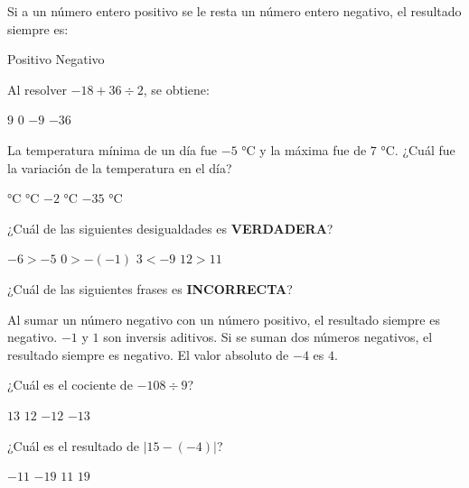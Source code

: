 \documentclass[spanish,letterpaper, 12pt, addpoints, answers]{exam}
\begin{document}
\begin{questions}
    \question[1] Si a un número entero positivo se le resta un número entero negativo, el resultado siempre es:
    \begin{choices}
        \CorrectChoice Positivo
        \choice Negativo
    \end{choices}
    \vspace{0.15in}

    \question[1] Al resolver $-18+36\div 2$, se obtiene:

    \begin{choices}
        \choice $9$
        \CorrectChoice $0$
        \choice $-9$
        \choice $-36$
    \end{choices}

    \question[1] La temperatura mínima de un día fue $-5$ °C y la máxima fue de $7$ °C. ¿Cuál fue la variación de la temperatura en el día?
    \begin{choices}
         °C
         °C
        \choice $-2$ °C
        \choice $-35$ °C
    \end{choices}

    \question[1] ¿Cuál de las siguientes desigualdades es \textbf{VERDADERA}?
    \begin{choices}
        \choice $-6>-5$
        \choice $0>-(-1)$
        \choice $3<-9$
        \CorrectChoice $12>11$
    \end{choices}
    \vspace{0.15in}

    \question[1] ¿Cuál de las siguientes frases es \textbf{INCORRECTA}?
    \begin{choices}
        \CorrectChoice Al sumar un número negativo con un número positivo, el resultado siempre es negativo.
        \choice $-1$ y $1$ son inversis aditivos.
        \choice Si se suman dos números negativos, el resultado siempre es negativo.
        \choice El valor absoluto de $-4$ es $4$.
    \end{choices}
    \vspace{0.15in}

    \question[1] ¿Cuál es el cociente de $-108\div 9$?
    \begin{choices}
        \choice $13$
        \choice $12$
        \CorrectChoice $-12$
        \choice $-13$
    \end{choices}
    \vspace{0.15in}

    \question[1] ¿Cuál es el resultado de $|15-(-4)|$?
    \begin{choices}
        \choice $-11$
        \choice $-19$
        \choice $11$
        \CorrectChoice $19$
    \end{choices}
    \vspace{0.15in}


\end{questions}
\end{document}
